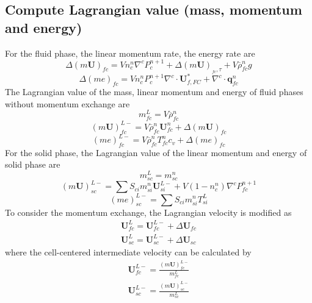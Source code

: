 \documentclass[preprint,12pt]{elsarticle}
\begin{document}
\subsection{\textsf{Compute Lagrangian value (mass, momentum and energy)}}
For the fluid phase, the linear momentum rate, the energy rate are
\begin{equation}
 \Delta (m \pmb{U})_{fc} = V n_c^n \nabla^c P_{c}^{n+1} +\Delta (m \pmb{U})_{_{fc},\tau} + V \overline{\rho}_{fc}^n g
\end {equation}
%
%
\begin{equation}
 \Delta (me)_{fc} = V n_c^n P_{c}^{n+1} \nabla^c \cdot \pmb{U}_{f,FC}^{*} + \nabla^c \cdot \pmb{q}_{fc}^n
\end {equation}
%
%
The Lagrangian value of the mass, linear momentum and energy of fluid phases without momentum exchange are
%
%
\begin{equation}
 m_{fc}^L = V \overline{\rho}_{fc}^n 
\end {equation}
%
%
\begin{equation}
 (m \pmb{U})_{fc}^{L-} = V \overline{\rho}_{fc}^n \pmb{U}_{fc}^n + \Delta (m \pmb{U})_{fc} 
\end {equation}
%
%
\begin{equation}
 (me)_{fc}^{L-} = V \overline{\rho}_{fc}^n T_{fc}^n    c_v + \Delta (me)_{fc} 
\end {equation}
%
%
For the solid phase, the Lagrangian value of the linear momentum and energy of solid phase are
%
\begin{equation}
 m_{sc}^L = m_{sc}^n
\end {equation}
%
\begin{equation}
 (m \pmb{U})_{sc}^{L-} = \sum{S_{ci} m_{si}^n \pmb{U}_{si}^{L-}} + V (1-n_c^n) \nabla^c P_{fc}^{n+1}
\end {equation}
%
\begin{equation}
 (me)_{sc}^{L-} =  \sum{S_{ci} m_{si}^n T_{si}^L}
\end {equation}
%
%
To consider the momentum exchange, the Lagrangian velocity is modified as
%
\begin{equation}
\begin{gathered}
\pmb{U}_{fc}^{L} = \pmb{U}_{fc}^{L-} + \Delta \pmb{U}_{fc} \\
\pmb{U}_{sc}^{L} = \pmb{U}_{sc}^{L-} + \Delta \pmb{U}_{sc}
\end {gathered}
\end {equation}
%
%
where the cell-centered intermediate velocity can be calculated by
%
\begin{equation}
\begin{gathered}
\pmb{U}_{fc}^{L-} = \frac{(m \pmb{U})_{fc}^{L-}}{m_{fc}^L} \\
\pmb{U}_{sc}^{L-} = \frac{(m \pmb{U})_{sc}^{L-}}{m_{sc}^L} 
\end {gathered}
\end {equation}
\end{document}
